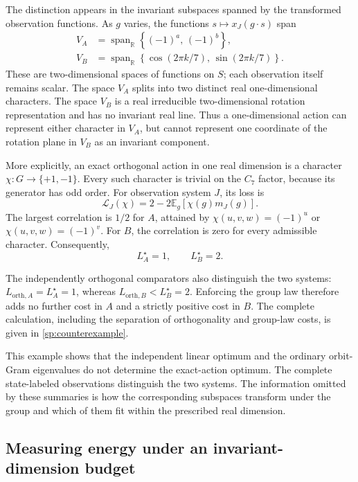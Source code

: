 The distinction appears in the invariant subspaces spanned
by the transformed observation functions.
As $g$ varies, the functions $s\mapsto x_J(g\cdot s)$ span
\[
 \begin{aligned}
 V_A
 &=\operatorname{span}_{\mathbb R}
   \left\{(-1)^a,\,(-1)^b\right\},\\
 V_B
 &=\operatorname{span}_{\mathbb R}
   \left\{\cos(2\pi k/7),\,\sin(2\pi k/7)\right\}.
 \end{aligned}
\]
These are two-dimensional spaces of functions on $S$;
each observation itself remains scalar.
The space $V_A$ splits into two distinct real
one-dimensional characters.
The space $V_B$ is a real irreducible two-dimensional
rotation representation and has no invariant real line.
Thus a one-dimensional action can represent either
character in $V_A$, but cannot represent one coordinate
of the rotation plane in $V_B$ as an invariant component.

More explicitly, an exact orthogonal action in one real
dimension is a character $\chi:G\to\{+1,-1\}$.
Every such character is trivial on the $C_7$ factor,
because its generator has odd order.
For observation system $J$, its loss is
\[
 \mathcal L_J(\chi)
 =
 2-2\mathbb E_g[\chi(g)m_J(g)].
\]
The largest correlation is $1/2$ for $A$, attained by
$\chi(u,v,w)=(-1)^u$ or $\chi(u,v,w)=(-1)^v$.
For $B$, the correlation is zero for every admissible
character.
Consequently,
\[
 \boxed{L_A^\star=1,\qquad L_B^\star=2.}
\]

The independently orthogonal comparators also distinguish
the two systems:
$L_{\mathrm{orth},A}=L_A^\star=1$, whereas
$L_{\mathrm{orth},B}<L_B^\star=2$.
Enforcing the group law therefore adds no further cost
in $A$ and a strictly positive cost in $B$.
The complete calculation, including the separation of
orthogonality and group-law costs, is given in
\cref{sp:counterexample}.

This example shows that the independent linear optimum
and the ordinary orbit-Gram eigenvalues do not determine
the exact-action optimum.
The complete state-labeled observations distinguish the
two systems.
The information omitted by these summaries is how the
corresponding subspaces transform under the group and
which of them fit within the prescribed real dimension.

\subsection{Measuring energy under an invariant-dimension budget}

